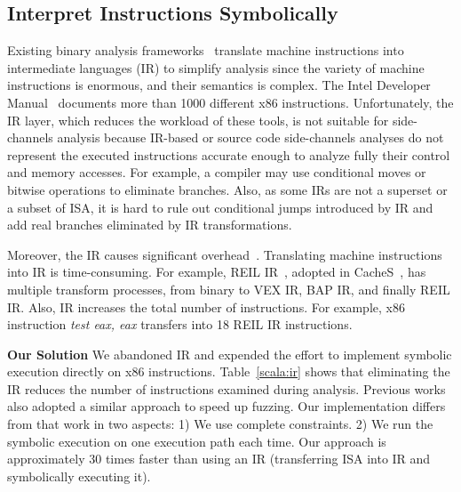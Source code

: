 \subsection{Interpret Instructions Symbolically}
Existing binary analysis frameworks~\cite{shoshitaishvili2016state,
  10.1007/978-3-642-22110-1_37, song2008bitblaze} translate machine instructions into
intermediate languages (IR) to simplify analysis since
the variety of machine instructions is
enormous, and their semantics is complex. The Intel Developer
Manual~\cite{intelsys} documents more than 1000 different x86 instructions.
Unfortunately, the IR layer, which
reduces the workload of these tools, is not suitable for side-channels
analysis because
IR-based or source code side-channels analyses do not represent the executed instructions accurate enough to analyze fully their control and memory accesses.
For example, a compiler may use conditional moves or bitwise operations to eliminate
branches. Also, as some IRs are not a superset or a subset of ISA,
it is hard to rule out conditional jumps introduced by IR and add real branches
eliminated by IR transformations.

Moreover, the IR causes significant overhead~\cite{217563}.
Translating machine instructions into IR is time-consuming. For example,
REIL IR~\cite{dullien2009reil}, adopted in CacheS~\cite{236338}, has multiple
transform processes, from binary to VEX IR, BAP IR, and finally REIL IR\@.
Also, IR increases the total number of instructions. For example, x86
instruction \textit{test eax, eax} transfers into 18 REIL IR instructions.

\textbf{Our Solution}
We abandoned IR and expended the effort to implement
symbolic execution directly on x86 instructions.
Table~\ref{scala:ir} shows that eliminating the IR reduces the number
of instructions examined during analysis. Previous works~\cite{217563} also
adopted a similar approach to speed up fuzzing. Our implementation differs
from that work in two aspects: 1) We use complete constraints. 2) We run the
symbolic execution on one execution path each time. Our approach is approximately 30 times faster than using an IR (transferring ISA into IR and
symbolically executing it).

